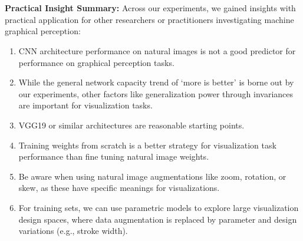 {%
%
%
%
\\~\\
\noindent \textbf{Practical Insight Summary:}
Across our experiments, we gained insights with practical application for other researchers or practitioners investigating machine graphical perception:
\begin{enumerate}[label=\arabic*.,itemsep=0.5pt, topsep=1pt, parsep=0.5pt]
\item CNN architecture performance on natural images is not a good predictor for performance on graphical perception tasks. 
\item While the general network capacity trend of `more is better' is borne out by our experiments, other factors like generalization power through invariances are important for visualization tasks.
\item VGG19 or similar architectures are reasonable starting points.
\item Training weights from scratch is a better strategy for visualization task performance than fine tuning natural image weights.
\item Be aware when using natural image augmentations like zoom, rotation, or skew, as these have specific meanings for visualizations.
\item For training sets, we can use parametric models to explore large visualization design spaces, where data augmentation is replaced by parameter and design variations (e.g., stroke width).
\end{enumerate}%
}%